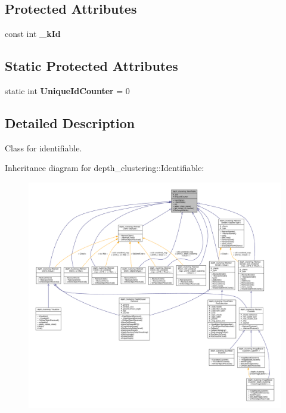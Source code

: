 \subsection*{Protected Attributes}
\begin{DoxyCompactItemize}
\item 
\mbox{\label{classdepth__clustering_1_1Identifiable_a82e9edccdd02896f9bcd2fa829645158}} 
const int {\bfseries \+\_\+k\+Id}
\end{DoxyCompactItemize}
\subsection*{Static Protected Attributes}
\begin{DoxyCompactItemize}
\item 
\mbox{\label{classdepth__clustering_1_1Identifiable_ac467cc001b2e67e09a10c7dc0da96c4c}} 
static int {\bfseries Unique\+Id\+Counter} = 0
\end{DoxyCompactItemize}


\subsection{Detailed Description}
Class for identifiable. 

Inheritance diagram for depth\+\_\+clustering\+:\+:Identifiable\+:\nopagebreak
\begin{figure}[H]
\begin{center}
\leavevmode
\includegraphics[width=350pt]{classdepth__clustering_1_1Identifiable__inherit__graph}
\end{center}
\end{figure}



